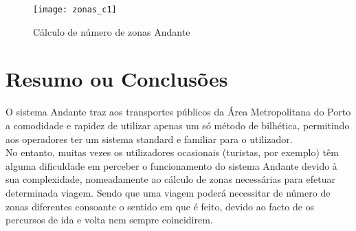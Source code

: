 \begin{figure}[t]
  \begin{center}
    \leavevmode
    \texttt{[image: zonas\_c1]}
    \caption{Cálculo de número de zonas Andante \cite{calczonas}}
    \label{fig:zonas_c1}
  \end{center}
\end{figure}

\section{Resumo ou Conclusões}

O sistema Andante traz aos transportes públicos da Área Metropolitana do Porto a comodidade e rapidez de utilizar apenas um só método de bilhética, permitindo aos operadores ter um sistema standard e familiar para o utilizador.
\\No entanto, muitas vezes os utilizadores ocasionais (turistas, por exemplo) têm alguma dificuldade em perceber o funcionamento do sistema Andante devido à sua complexidade, nomeadamente ao cálculo de zonas necessárias para efetuar determinada viagem. Sendo que uma viagem poderá necessitar de número de zonas diferentes consoante o sentido em que é feito, devido ao facto de os percursos de ida e volta nem sempre coincidirem.